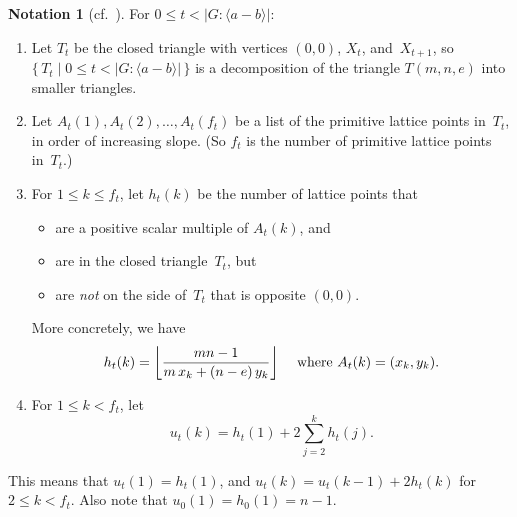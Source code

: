 \documentclass[11pt]{amsart}
\theoremstyle{definition}
\newtheorem{notation}[equation]{Notation}
\numberwithin{case}{startcases}
\numberwithin{equation}{section}
\begin{document}
	\begin{notation}[cf.\ {\cite[pp.~37--38]{Curran}}] \label{uDefn}
		For $0\leq t < |G : \langle a - b \rangle|$:
		\begin{enumerate}
			\item Let $T_t$ be the closed triangle with vertices $(0,0)$, $X_t$, and~$X_{t+1}$, so
			$\{\, T_t \mid  0 \le t < |G : \langle a - b \rangle| \,\} $
			is a decomposition of the triangle $T(m,n,e)$ into smaller triangles.
			\item Let $A_t(1), A_t(2), \ldots, A_t(f_t)$ be a list of the primitive lattice points in~$T_t$, in order of increasing slope. (So $f_t$ is the number of primitive lattice points in~$T_t$.)
			\item For $1 \le k \le f_t$, let $h_t(k)$ be the number of lattice points that 
			\begin{itemize}
				\item are a positive scalar multiple of $A_t(k)$, and
				\item are in the closed triangle~$T_t$, but
				\item are \emph{not} on the side of~$T_t$ that is opposite $(0,0)$.
			\end{itemize}
			More concretely, we have
			\[ \text{$\displaystyle h_t(k) = \left\lfloor\frac{mn-1}{m \, x_k + (n - e) \, y_k}\right\rfloor$ \quad where $A_t(k) = (x_k,y_k)$} . \]
			\item \label{uDefn-utk}
			For $1 \le k < f_t$, let 
			\[ u_t(k) = h_t(1) + 2 \sum_{j=2}^k h_t(j) . \]
		\end{enumerate}
		This means that $u_t(1) = h_t(1)$, and $u_t(k) = u_t(k - 1) + 2 h_t(k)$ for $2 \le k < f_t$.
		Also note that $u_0(1) = h_0(1) = n-1$. 
	\end{notation}
	
\end{document}
